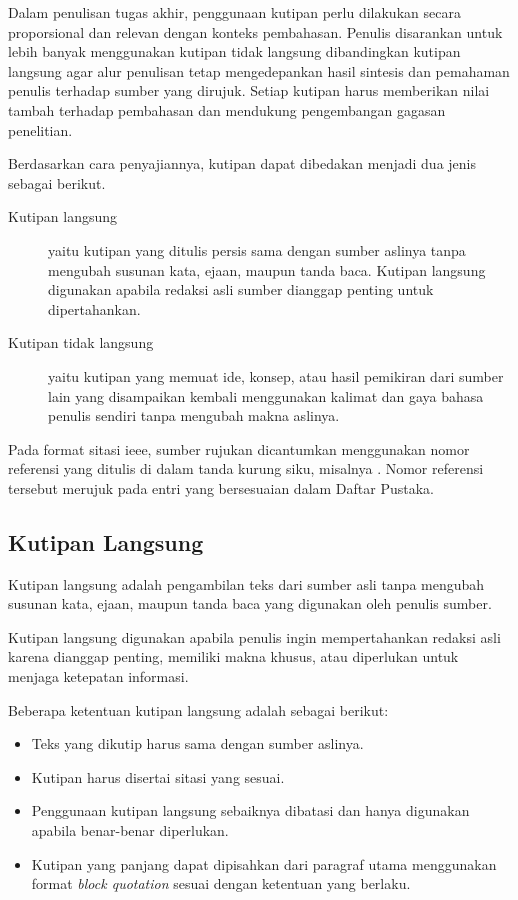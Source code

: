 Dalam penulisan tugas akhir, penggunaan kutipan perlu dilakukan secara proporsional dan relevan dengan konteks pembahasan. Penulis disarankan untuk lebih banyak menggunakan kutipan tidak langsung dibandingkan kutipan langsung agar alur penulisan tetap mengedepankan hasil sintesis dan pemahaman penulis terhadap sumber yang dirujuk. Setiap kutipan harus memberikan nilai tambah terhadap pembahasan dan mendukung pengembangan gagasan penelitian.

Berdasarkan cara penyajiannya, kutipan dapat dibedakan menjadi dua jenis sebagai berikut.

\begin{description}
    \item[Kutipan langsung] yaitu kutipan yang ditulis persis sama dengan sumber aslinya tanpa mengubah susunan kata, ejaan, maupun tanda baca. Kutipan langsung digunakan apabila redaksi asli sumber dianggap penting untuk dipertahankan.
    
    \item[Kutipan tidak langsung] yaitu kutipan yang memuat ide, konsep, atau hasil pemikiran dari sumber lain yang disampaikan kembali menggunakan kalimat dan gaya bahasa penulis sendiri tanpa mengubah makna aslinya.
\end{description}

Pada format sitasi \gls{ieee}, sumber rujukan dicantumkan menggunakan nomor referensi yang ditulis di dalam tanda kurung siku, misalnya \cite{IEEEReferenceGuide2023}. Nomor referensi tersebut merujuk pada entri yang bersesuaian dalam Daftar Pustaka.

\subsection{Kutipan Langsung}

Kutipan langsung adalah pengambilan teks dari sumber asli tanpa mengubah susunan kata, ejaan, maupun tanda baca yang digunakan oleh penulis sumber.

Kutipan langsung digunakan apabila penulis ingin mempertahankan redaksi asli karena dianggap penting, memiliki makna khusus, atau diperlukan untuk menjaga ketepatan informasi.

Beberapa ketentuan kutipan langsung adalah sebagai berikut:

\begin{itemize}[topsep=0pt,itemsep=0pt,parsep=0pt,leftmargin=*]
\item Teks yang dikutip harus sama dengan sumber aslinya.
\item Kutipan harus disertai sitasi yang sesuai.
\item Penggunaan kutipan langsung sebaiknya dibatasi dan hanya digunakan apabila benar-benar diperlukan.
\item Kutipan yang panjang dapat dipisahkan dari paragraf utama menggunakan format \textit{block quotation} sesuai dengan ketentuan yang berlaku.
\end{itemize}

